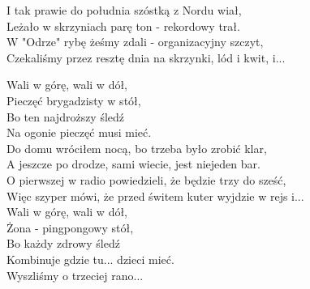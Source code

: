 I tak prawie do południa szóstką z Nordu wiał, \\
Leżało w skrzyniach parę ton - rekordowy trał. \\
W "Odrze" rybę żeśmy zdali - organizacyjny szczyt, \\
Czekaliśmy przez resztę dnia na skrzynki, lód i kwit, i... \\
\newpage

Wali w górę, wali w dół, \\
Pieczęć brygadzisty w stół, \\
Bo ten najdroższy śledź \\
Na ogonie pieczęć musi mieć. \\

Do domu wróciłem nocą, bo trzeba było zrobić klar, \\
A jeszcze po drodze, sami wiecie, jest niejeden bar. \\
O pierwszej w radio powiedzieli, że będzie trzy do sześć, \\
Więc szyper mówi, że przed świtem kuter wyjdzie w rejs i... \\

Wali w górę, wali w dół, \\
Żona - pingpongowy stół, \\
Bo każdy zdrowy śledź \\
Kombinuje gdzie tu... dzieci mieć. \\

Wyszliśmy o trzeciej rano...
